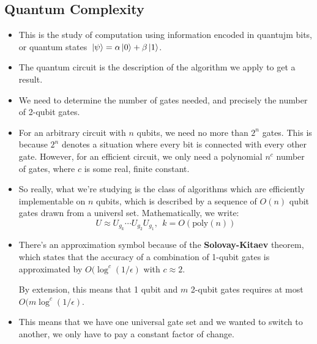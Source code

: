 \subsection{Quantum Complexity}
\begin{itemize}
	\item This is the study of computation using information encoded in quantujm bits, or quantum 
		states \( \ket*{\psi} = \alpha \ket*{0} + \beta\ket*{1} \).
	\item The quantum circuit is the description of the algorithm we apply to get a result. 
	\item We need to determine the number of gates needed, and precisely the number of 2-qubit gates.   
	\item For an arbitrary circuit with \( n \) qubits, we need no more than \( 2^{n} \) gates. This is because 
		\( 2^{n} \) denotes a situation where every bit is connected with every other gate. However, for an efficient
		circuit, we only need a polynomial \( n^{c} \) number of gates, where \( c \) is some real, finite 
		constant.
	\item So really, what we're studying is the class of algorithms which are efficiently implementable on \( n \) 
		qubits, which is described by a sequence of \( O(n) \) qubit gates drawn from a universl set. Mathematically, 
		we write: 
		\[
		U \approx U_{g_k} \cdots U_{g_2}U_{g_1}, \ \ k = O(\text{poly}(n))
		\] 
	\item There's an approximation symbol because of the \textbf{Solovay-Kitaev} theorem, which states 
		that the accuracy of a combination of 1-qubit gates is approximated by 
		\( O(\log^{c}(1 / \epsilon) \) with \( c \approx 2 \). 

		By extension, this means that 1 qubit and \( m \) 2-qubit gates requires at most 
		\( O(m \log^{c}(1 / \epsilon) \). 
	\item This means that we have one universal gate set and we wanted to switch to another, we only have to pay 
		a constant factor of change.  
		
\end{itemize}
